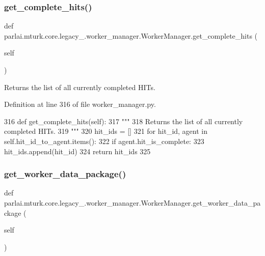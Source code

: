 \subsubsection{\texorpdfstring{get\+\_\+complete\+\_\+hits()}{get\_complete\_hits()}}
{\footnotesize\ttfamily def parlai.\+mturk.\+core.\+legacy\+\_.\+worker\+\_\+manager.\+Worker\+Manager.\+get\+\_\+complete\+\_\+hits (\begin{DoxyParamCaption}\item[{}]{self }\end{DoxyParamCaption})}

\begin{DoxyVerb}Returns the list of all currently completed HITs.
\end{DoxyVerb}
 

Definition at line 316 of file worker\+\_\+manager.\+py.


\begin{DoxyCode}
316     \textcolor{keyword}{def }get\_complete\_hits(self):
317         \textcolor{stringliteral}{"""}
318 \textcolor{stringliteral}{        Returns the list of all currently completed HITs.}
319 \textcolor{stringliteral}{        """}
320         hit\_ids = []
321         \textcolor{keywordflow}{for} hit\_id, agent \textcolor{keywordflow}{in} self.hit\_id\_to\_agent.items():
322             \textcolor{keywordflow}{if} agent.hit\_is\_complete:
323                 hit\_ids.append(hit\_id)
324         \textcolor{keywordflow}{return} hit\_ids
325 
\end{DoxyCode}
\mbox{\label{classparlai_1_1mturk_1_1core_1_1legacy__2018_1_1worker__manager_1_1WorkerManager_ab86707310cf5c8bc79dc9aae56bae44d}} 
\subsubsection{\texorpdfstring{get\+\_\+worker\+\_\+data\+\_\+package()}{get\_worker\_data\_package()}}
{\footnotesize\ttfamily def parlai.\+mturk.\+core.\+legacy\+\_.\+worker\+\_\+manager.\+Worker\+Manager.\+get\+\_\+worker\+\_\+data\+\_\+package (\begin{DoxyParamCaption}\item[{}]{self }\end{DoxyParamCaption})}



